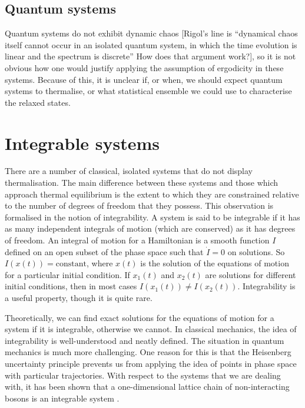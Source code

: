 \documentclass[a4paper, 10pt]{article}
\theoremstyle{plain}
\begin{document}
\subsection{Quantum systems}
Quantum systems do not  exhibit dynamic chaos  [Rigol's line is ``dynamical chaos itself cannot occur in an isolated
quantum system, in which the time evolution is linear and the spectrum is
discrete'' How does that argument work?], so it is not obvious how one would
justify applying the assumption of ergodicity in these systems. Because of
this, it is unclear if, or when, we should expect quantum systems to
thermalise, or what statistical ensemble we could use to characterise the
relaxed states.


\section{Integrable systems}
There are a number of classical, isolated systems that do not display
thermalisation. The main difference between these systems and those which
approach thermal equilibrium is the extent to which they are constrained
relative to the number of degrees of freedom that they possess. This observation
is formalised in the notion of integrability. A system is said to be integrable
if it has  as
many independent integrals of motion (which are conserved) as it has degrees
of freedom. An integral of motion for a Hamiltonian is a smooth function
$I$ defined on an open subset of the phase space such that $\dot{I}=0$ on
solutions. So $I(x(t))=\text{constant}$, where $x(t)$ is the solution of the
equations of motion for a particular initial condition. If $x_1(t)$ and
$x_2(t)$ are solutions for different initial conditions, then in most cases
$I(x_1(t))\ne I(x_2(t))$. Integrability is a useful property, though it is
quite rare.

Theoretically, we can find exact solutions for the equations of motion for a
system if it is integrable, otherwise we cannot. In classical mechanics, the
idea of integrability is well-understood and neatly defined. The situation in
quantum mechanics is much more challenging. One reason for this is that
the Heisenberg uncertainty principle prevents us from applying the idea of
points in phase space with particular trajectories. With respect to the systems
that we are dealing with, it has been shown that a one-dimensional lattice
chain of non-interacting bosons is an integrable system \cite{Rigol2007}.
\end{document}
